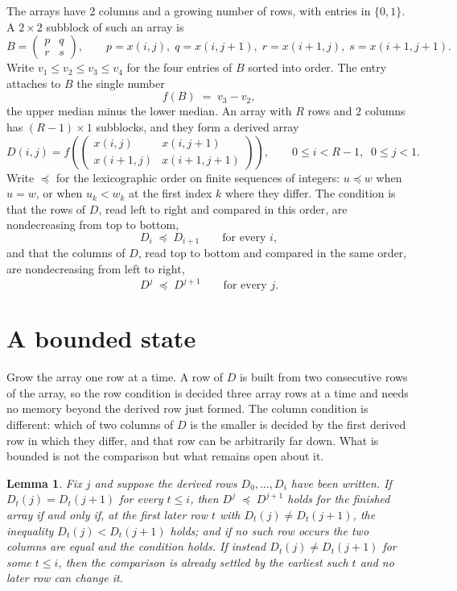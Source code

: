 \documentclass[11pt,a4paper]{article}
\theoremstyle{plain}
\newtheorem{lemma}[theorem]{Lemma}
\theoremstyle{definition}
\begin{document}
The arrays have $2$ columns and a growing number of rows, with entries in $\{0,1\}$. A
$2\times2$ subblock of such an array is
\[
B=\begin{pmatrix} p & q \\ r & s \end{pmatrix},
\qquad p=x(i,j),\; q=x(i,j+1),\; r=x(i+1,j),\; s=x(i+1,j+1).
\]
Write $v_1\le v_2\le v_3\le v_4$ for the four entries of $B$ sorted into order. The entry attaches to $B$ the single number
\[
f(B)\;=\;v_3-v_2,
\]
the upper median minus the lower median. An array with $R$ rows and $2$ columns has $(R-1)\times1$ subblocks, and they
form a derived array
\[
D(i,j)=f\!\left(\begin{pmatrix} x(i,j) & x(i,j+1) \\ x(i+1,j) & x(i+1,j+1)\end{pmatrix}
\right),\qquad 0\le i<R-1,\;\; 0\le j<1 .
\]
Write $\preceq$ for the lexicographic order on finite sequences of integers: $u\preceq w$ when
$u=w$, or when $u_k<w_k$ at the first index $k$ where they differ. The condition is that the
rows of $D$, read left to right and compared in this order, are nondecreasing from top to bottom,
\[
D_{i}\;\preceq\;D_{i+1}\qquad\text{for every } i,
\]
and that the columns of $D$, read top to bottom and compared in the same order, are nondecreasing
from left to right,
\[
D^{j}\;\preceq\;D^{j+1}\qquad\text{for every } j .
\]

\section{A bounded state}

Grow the array one row at a time. A row of $D$ is built from two consecutive rows of the array,
so the row condition is decided three array rows at a time and needs no memory beyond the
derived row just formed. The column condition is different: which of two columns of $D$ is the
smaller is decided by the first derived row in which they differ, and that row can be
arbitrarily far down. What is bounded is not the comparison but what remains open about it.

\begin{lemma}\label{lem:bits}
Fix $j$ and suppose the derived rows $D_0,\dots,D_i$ have been written. If $D_t(j)=D_t(j+1)$ for
every $t\le i$, then $D^{j}\;\preceq\;D^{j+1}$ holds for the finished array if and only if,
at the first later row $t$ with $D_t(j)\neq D_t(j+1)$, the inequality $D_t(j)<D_t(j+1)$
holds; and if no such row occurs the two columns are equal and the condition holds. If instead
$D_t(j)\neq D_t(j+1)$ for some $t\le i$, then the comparison is already settled by the earliest
such $t$ and no later row can change it.
\end{lemma}
\end{document}
